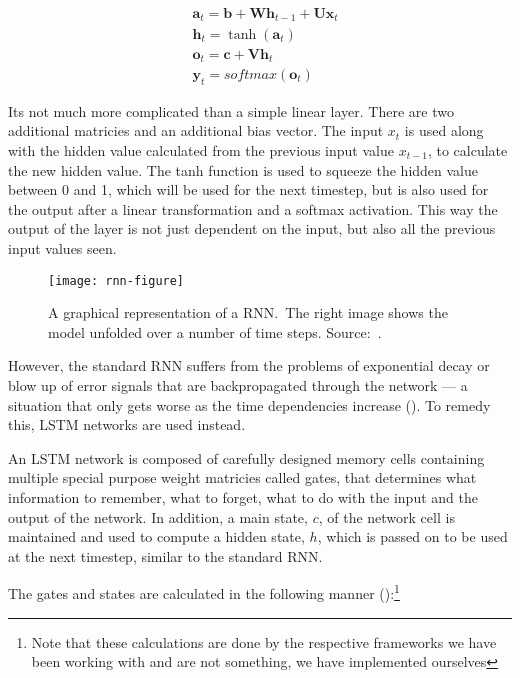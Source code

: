 \begin{align*}
    & \textbf{a}_t = \textbf{b} + \textbf{W} \textbf{h}_{t-1} + \textbf{U} \textbf{x}_t \\
    & \textbf{h}_t = \tanh(\textbf{a}_t) \\
    & \textbf{o}_t = \textbf{c} + \textbf{V} \textbf{h}_t \\
    & \textbf{y}_t = softmax(\textbf{o}_t)
\end{align*}

Its not much more complicated than a simple linear layer. There are two
additional matricies and an additional bias vector. The input $x_t$ is used
along with the hidden value calculated from the previous input value $x_{t-1}$,
to calculate the new hidden value. The tanh function is used to squeeze the
hidden value between 0 and 1, which will be used for the next timestep, but is
also used for the output after a linear transformation and a softmax activation.
This way the output of the layer is not just dependent on the input, but also
all the previous input values seen.

\begin{figure}[h]
    \texttt{[image: rnn-figure]}
    \caption{A graphical representation of a RNN.\ The right image shows the
    model unfolded over a number of time steps. Source:~\cite{olah2015lstm}.
    }\label{fig:rnn}
\end{figure}

However, the standard RNN suffers from the problems of exponential decay or blow
up of error signals that are backpropagated through the network --- a situation
that only gets worse as the time dependencies increase
(\cite{hochreiter2001gradient}). To remedy this, LSTM networks are used instead.

An LSTM network is composed of carefully designed memory cells containing
multiple special purpose weight matricies called gates, that determines what
information to remember, what to forget, what to do with the input and the
output of the network. In addition, a main state, $c$, of the network cell is
maintained and used to compute a hidden state, $h$, which is passed on to be
used at the next timestep, similar to the standard RNN.\

The gates and states are calculated in the following manner
(\cite{huang2015bidirectional}):\footnote{Note that
    these calculations are done by the respective frameworks we have been
working with and are not something, we have implemented ourselves}


